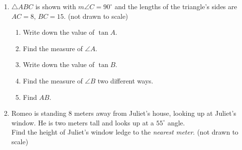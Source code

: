 \begin{enumerate}
\item $\triangle ABC$ is shown with $m\angle C=90^\circ$ and the lengths of the triangle's sides are $AC=8$, $BC=15$.  \hfill (not drawn to scale)
  \begin{multicols}{2}
    \begin{enumerate}
      \item Write down the value of $\tan A$. \vspace{1.25cm}
      \item Find the measure of $\angle A$. \vspace{1cm}
      \item Write down the value of $\tan B$. \vspace{1.25cm}
      \item Find the measure of $\angle B$ two different ways. \vspace{1cm}
      \item Find $AB$.
    \end{enumerate}
    \begin{flushright}
    \end{flushright}
  \end{multicols}
  \vspace{3cm}

\newpage
\item Romeo is standing 8 meters away from Juliet's house, looking up at Juliet's window. He is two meters tall and looks up at a $55^\circ$ angle.\\[0.25cm]
Find the height of Juliet's window ledge to the \emph{nearest meter}. \hfill (not drawn to scale)
  \begin{flushright}
    \end{flushright}
    


\end{enumerate}
